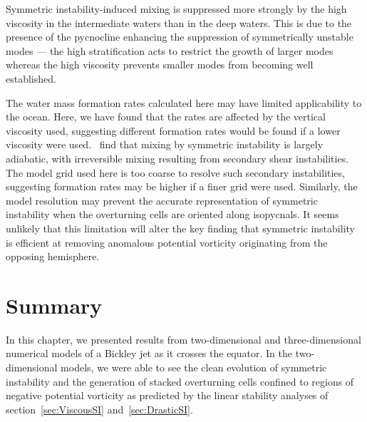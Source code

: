 Symmetric instability-induced mixing is suppressed more strongly by the high viscosity in the intermediate waters than in the deep waters. This is due to the presence of the pycnocline enhancing the suppression of symmetrically unstable modes --- the high stratification acts to restrict the growth of larger modes whereas the high viscosity prevents smaller modes from becoming well established.

The water mass formation rates calculated here may have limited applicability to the ocean. Here, we have found that the rates are affected by the vertical viscosity used, suggesting different formation rates would be found if a lower viscosity were used.~\citet{Yankovsky2019} find that mixing by symmetric instability is largely adiabatic, with irreversible mixing resulting from secondary shear instabilities. The model grid used here is too coarse to resolve such secondary instabilities, suggesting formation rates may be higher if a finer grid were used. Similarly, the model resolution may prevent the accurate representation of symmetric instability when the overturning cells are oriented along isopycnals. It seems unlikely that this limitation will alter the key finding that symmetric instability is efficient at removing anomalous potential vorticity originating from the opposing hemisphere.


\section{Summary}
In this chapter, we presented results from two-dimensional and three-dimensional numerical models of a Bickley jet as it crosses the equator. In the two-dimensional models, we were able to see the clean evolution of symmetric instability and the generation of stacked overturning cells confined to regions of negative potential vorticity as predicted by the linear stability analyses of section~\ref{sec:ViscousSI} and~\ref{sec:DrasticSI}.

